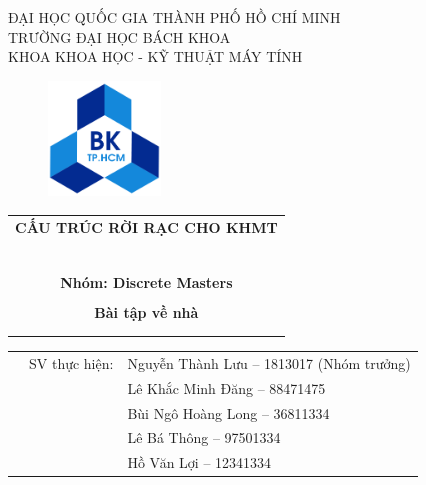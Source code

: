 \documentclass[a4paper]{article}
\begin{document}
\begin{titlepage}
\begin{center}
ĐẠI HỌC QUỐC GIA THÀNH PHỐ HỒ CHÍ MINH \\
TRƯỜNG ĐẠI HỌC BÁCH KHOA \\
KHOA KHOA HỌC - KỸ THUẬT MÁY TÍNH 
\end{center}

\vspace{1cm}

\begin{figure}[h!]
\begin{center}
\includegraphics[width=3cm]{Images/hcmut.png}
\end{center}
\end{figure}

\vspace{1cm}


\begin{center}
\begin{tabular}{c}
\multicolumn{1}{l}{\textbf{{\Large CẤU TRÚC RỜI RẠC CHO KHMT}}}\\
~~\\
\hline
\\
\textbf{{\Large Nhóm: Discrete Masters}}\\
\\
\textbf{{\Huge Bài tập về nhà}} \\ \\ \\

\hline
\end{tabular}
\end{center}

\vspace{1.5cm}

\begin{table}[h]
\begin{tabular}{rrl} 
\hspace{5 cm} & SV thực hiện: & Nguyễn Thành Lưu -- 1813017 (Nhóm trưởng) \\
& & Lê Khắc Minh Đăng -- 88471475 \\
& & Bùi Ngô Hoàng Long -- 36811334 \\
& & Lê Bá Thông -- 97501334 \\
& & Hồ Văn Lợi -- 12341334 \\
\end{tabular}
\end{table}
\vspace{1.5cm}
\end{titlepage}
\end{document}
